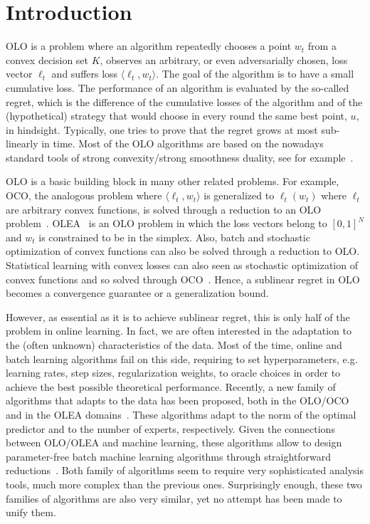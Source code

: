 \section{Introduction}
\label{section:introduction}

\ac{OLO} is a problem where an algorithm repeatedly chooses a point $w_t$ from a
convex decision set $K$, observes an arbitrary, or even adversarially chosen,
loss vector $\ell_t$ and suffers loss $\langle \ell_t, w_t \rangle$. The goal of
the algorithm is to have a small cumulative loss. The performance of an
algorithm is evaluated by the so-called regret, which is the difference of the
cumulative losses of the algorithm and of the (hypothetical) strategy that would
choose in every round the same best point, $u$, in hindsight. Typically, one
tries to prove that the regret grows at most sub-linearly in time. Most of the
\ac{OLO} algorithms are based on the nowadays standard tools of strong
convexity/strong smoothness duality, see for example~\citet{OrabonaCCB15}.

\ac{OLO} is a basic building block in many other related problems. For example,
\ac{OCO}, the analogous problem where $\langle \ell_t, w_t \rangle$ is
generalized to $\ell_t(w_t)$ where $\ell_t$ are arbitrary convex functions, is
solved through a reduction to an \ac{OLO}
problem~\citep{Cesa-BianchiL06,Shalev-Shwartz12}.
\ac{OLEA}~\citep{LittlestoneW94,Vovk98,Cesa-BianchiFHHSW97} is an \ac{OLO}
problem in which the loss vectors belong to $[0,1]^N$ and $w_t$ is constrained
to be in the simplex. Also, batch and stochastic optimization of convex
functions can also be solved through a reduction to \ac{OLO}. Statistical
learning with convex losses can also seen as stochastic optimization of convex
functions and so solved through \ac{OCO}~\citep{Munro1951}. Hence, a sublinear
regret in \ac{OLO} becomes a convergence guarantee or a generalization bound.

However, as essential as it is to achieve sublinear regret, this is only half of
the problem in online learning. In fact, we are often interested in the
adaptation to the (often unknown) characteristics of the data. Most of the time,
online and batch learning algorithms fail on this side, requiring to set
hyperparameters, e.g. learning rates, step sizes, regularization weights, to
oracle choices in order to achieve the best possible theoretical performance.
Recently, a new family of algorithms that adapts to the data has been proposed,
both in the
\ac{OLO}/\ac{OCO}~\citep{StreeterM12,Orabona13,McMahanA13,McMahanO14,Orabona14}
and in the \ac{OLEA}
domains~\citep{ChaudhuriYH09,ChernovV10,LuoE14,LuoS15,KoolenE15}. These
algorithms adapt to the norm of the optimal predictor and to the number of
experts, respectively. Given the connections between \ac{OLO}/\ac{OLEA} and machine learning,
these algorithms allow to design parameter-free batch machine learning
algorithms through straightforward reductions~\citep{Orabona14,LuoS15}. Both
family of algorithms seem to require very sophisticated analysis tools, much
more complex than the previous ones. Surprisingly enough, these two families of
algorithms are also very similar, yet no attempt has been made to unify them.

